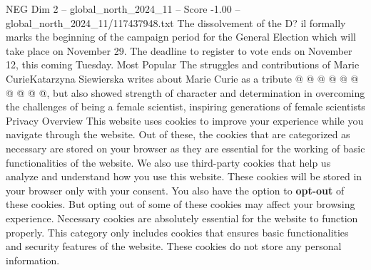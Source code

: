 \begin{textsample}{NEG Dim 2 – global\_north\_2024\_11 – Score -1.00 – global\_north\_2024\_11/117437948.txt}
The dissolvement of the D? il formally marks the beginning of the campaign period for the General Election which will take place on November 29.
The deadline to register to vote ends on November 12, this coming Tuesday.
Most Popular The struggles and contributions of Marie CurieKatarzyna Siewierska writes about Marie Curie as a tribute @ @ @ @ @ @ @ @ @ @, but also showed strength of character and determination in overcoming the challenges of being a female scientist, inspiring generations of female scientists Privacy Overview This website uses cookies to improve your experience while you navigate through the website.
Out of these, the cookies that are categorized as necessary are stored on your browser as they are essential for the working of basic functionalities of the website.
We also use third-party cookies that help us analyze and understand how you use this website.
These cookies will be stored in your browser only with your consent.
You also have the option to \textbf{opt-out} of these cookies.
But opting out of some of these cookies may affect your browsing experience.
Necessary cookies are absolutely essential for the website to function properly.
This category only includes cookies that ensures basic functionalities and security features of the website.
These cookies do not store any personal information.

\end{textsample}
